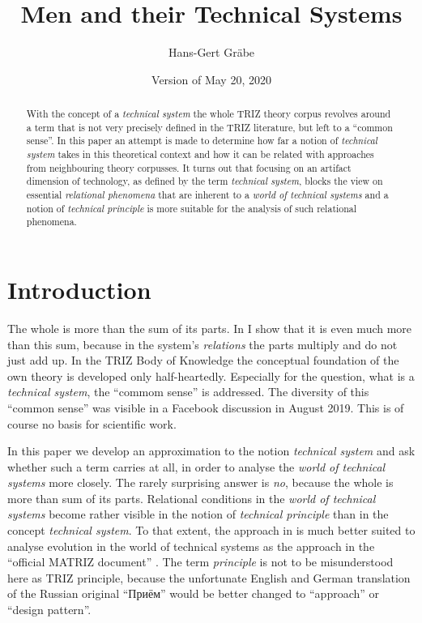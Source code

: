 \documentclass{llncs}
\title{Men and their Technical Systems}
\author{Hans-Gert Gräbe\orcidID{0000-0002-3934-413X}}
\institute{Leipzig University, D-04009 Leipzig, Germany,\\    
  \email{graebe@informatik.uni-leipzig.de},\\ WWW home page:
  \texttt{http://informatik.uni-leipzig.de/\~{}graebe}}
\date{Version of May 20, 2020}
\begin{document}
\maketitle

\begin{abstract}
  With the concept of a \emph{technical system} the whole TRIZ theory corpus
  revolves around a term that is not very precisely defined in the TRIZ
  literature, but left to a ``common sense''.  In this paper an attempt is
  made to determine how far a notion of \emph{technical system} takes in this
  theoretical context and how it can be related with approaches from
  neighbouring theory corpusses.  It turns out that focusing on an artifact
  dimension of technology, as defined by the term \emph{technical system},
  blocks the view on essential \emph{relational phenomena} that are inherent
  to a \emph{world of technical systems} and a notion of \emph{technical
    principle} is more suitable for the analysis of such relational phenomena.
\end{abstract}

\section{Introduction}

The whole is more than the sum of its parts. In \cite{Graebe2020a} I show that
it is even much more than this sum, because in the system's \emph{relations}
the parts multiply and do not just add up.  In the TRIZ Body of Knowledge
\cite{TBK-2007} the conceptual foundation of the own theory is developed only
half-heartedly. Especially for the question, what is a \emph{technical
  system}, the ``commom sense'' is addressed. The diversity of this ``common
sense'' was visible in a Facebook discussion \cite{Graebe2019} in August
2019.  This is of course no basis for scientific work.

In this paper we develop an approximation to the notion \emph{technical
  system} and ask whether such a term carries at all, in order to analyse the
\emph{world of technical systems} more closely.  The rarely surprising answer
is \emph{no}, because the whole is more than sum of its parts.  Relational
conditions in the \emph{world of technical systems} become rather visible in
the notion of \emph{technical principle} than in the concept \emph{technical
  system}. To that extent, the approach in \cite{Shpakovsky2010} is much
better suited to analyse evolution in the world of technical systems as the
approach in the ``official MATRIZ document'' \cite{TESE2018}.  The term
\emph{principle} is not to be misunderstood here as TRIZ principle, because
the unfortunate English and German translation of the Russian original
\foreignlanguage{russian}{``Приём''} would be better changed to ``approach''
or ``design pattern''.
\end{document}
